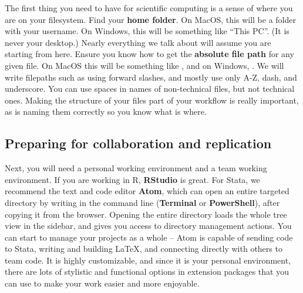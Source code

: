 The first thing you need to have for scientific computing
is a sense of where you are on your filesystem.
Find your \textbf{home folder}. On MacOS, this will be a folder with your username.
On Windows, this will be something like ``This PC''. (It is never your desktop.)
Nearly everything we talk about will assume you are starting from here.
Ensure you know how to get the \textbf{absolute file path} for any given file.
On MacOS this will be something like ,
and on Windows, .
We will write filepaths such as 
using forward slashes, and mostly use only A-Z, dash, and underscore.
You can use spaces in names of non-technical files, but not technical ones.
Making the structure of your files part of your workflow is really important,
as is naming them correctly so you know what is where.

\subsection{Preparing for collaboration and replication}

Next, you will need a personal working environment and a team working environment.
If you are working in R, \textbf{RStudio} is great.
For Stata, we recommend the text and code editor \textbf{Atom},
which can open an entire targeted directory by writing 
in the command line (\textbf{Terminal} or \textbf{PowerShell}), after copying it from the browser.
Opening the entire directory loads the whole tree view in the sidebar,
and gives you access to directory management actions.
You can start to manage your projects as a whole --
Atom is capable of sending code to Stata,
writing and building \LaTeX,
and connecting directly with others to team code.
It is highly customizable, and since it is your personal environment,
there are lots of stylistic and functional options in extension packages
that you can use to make your work easier and more enjoyable.

